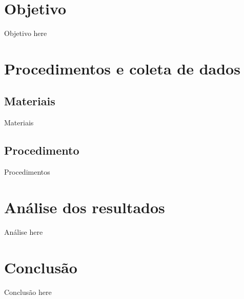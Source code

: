 \documentclass[a4paper]{article}
\begin{document}
\section{Objetivo}
Objetivo here

\section{Procedimentos e coleta de dados}
\subsection{Materiais}
Materiais

\subsection{Procedimento}
Procedimentos
	

\section{Análise dos resultados}
Análise here

\section{Conclusão}
Conclusão here
\end{document}
